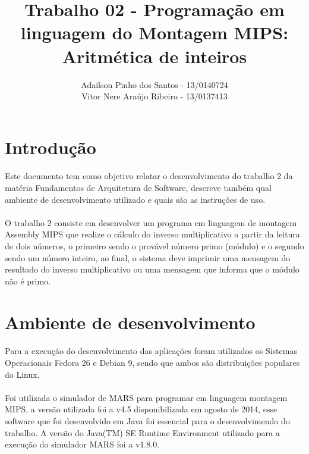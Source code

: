 \documentclass[11pt]{article}
\begin{document}
\title{Trabalho 02 - Programa\c{c}\~ao em linguagem do Montagem MIPS: Aritm\'etica de inteiros}
\author{Adailson Pinho dos Santos - 13/0140724\\
Vitor Nere Ara\'ujo Ribeiro - 13/0137413}
\date{}
\maketitle

\newpage

\tableofcontents

\newpage

\section{Introdu\c{c}\~ao}
	\paragraph{}	Este documento tem como objetivo relatar o desenvolvimento do trabalho 2 da mat\'eria Fundamentos de Arquitetura de Software, descreve tamb\'em qual ambiente de desenvolvimento utilizado e quais s\~ao as instru\c{c}\~oes de uso. 
	\paragraph{}	O trabalho 2 consiste em desenvolver um programa em linguagem de montagem Assembly MIPS que realize o c\'alculo do inverso multiplicativo a partir da leitura de dois n\'umeros, o primeiro sendo o prov\'avel n\'umero primo (m\'odulo) e o segundo sendo um n\'umero inteiro, ao final, o sistema deve imprimir uma mensagem do resultado do inverso multiplicativo ou uma mensagem que informa que o m\'odulo n\~ao \'e primo. 
\section{Ambiente de desenvolvimento}
    \paragraph{}	Para a execu\c{c}\~ao do desenvolvimento das aplica\c{c}\~oes foram utilizados os Sistemas Operacionais Fedora 26 e Debian 9, sendo que ambos s\~ao distribui\c{c}\~oes populares do Linux. 
    \paragraph{}	Foi utilizada o simulador de MARS para programar em linguagem montagem MIPS, a vers\~ao utilizada foi a v4.5 disponibilizada em agosto de 2014, esse software que foi desenvolvido em Java foi essencial para o desenvolvimendo do trabalho. A vers\~ao do Java(TM) SE Runtime Environment utilizado para a execu\c{c}\~ao do simulador MARS foi a v1.8.0.
\end{document}
